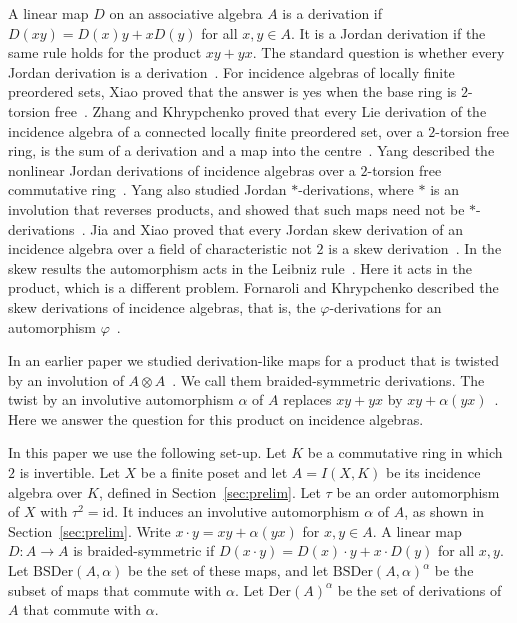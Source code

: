 \documentclass[]{interact}
\theoremstyle{plain}
\theoremstyle{definition}
\theoremstyle{remark}
\newcommand{\Der}{\mathrm{Der}}
\newcommand{\BSDer}{\mathrm{BSDer}}
\begin{document}
A linear map $D$ on an associative algebra $A$ is a derivation if $D(xy) = D(x)y + xD(y)$ for all $x, y \in A$.
It is a Jordan derivation if the same rule holds for the product $xy + yx$. %
The standard question is whether every Jordan derivation is a derivation~\cite{Xiao2015}.
For incidence algebras of locally finite preordered sets, Xiao proved that the answer is yes when the base ring is $2$-torsion free~\cite[Theorem 3.3]{Xiao2015}.
Zhang and Khrypchenko proved that every Lie derivation of the incidence algebra of a connected locally finite preordered set, over a $2$-torsion free ring, is the sum of a derivation and a map into the centre~\cite[Theorem 3.10]{ZhangKhrypchenko2017}.
Yang described the nonlinear Jordan derivations of incidence algebras over a $2$-torsion free commutative ring~\cite[Theorem 3.1]{Yang2021}.
Yang also studied Jordan $*$-derivations, where $*$ is an involution that reverses products, and showed that such maps need not be $*$-derivations~\cite[Example 3.1]{Yang2025}.
Jia and Xiao proved that every Jordan skew derivation of an incidence algebra over a field of characteristic not $2$ is a skew derivation~\cite[Theorem 3.8]{JiaXiao2025}.
In the skew results the automorphism acts in the Leibniz rule~\cite{JiaXiao2025, FornaroliKhrypchenko2023}.
Here it acts in the product, which is a different problem.
Fornaroli and Khrypchenko described the skew derivations of incidence algebras, that is, the $\varphi$-derivations for an automorphism $\varphi$~\cite[Theorem 2.8]{FornaroliKhrypchenko2023}.

In an earlier paper we studied derivation-like maps for a product that is twisted by an involution of $A \otimes A$~\cite[Section 3]{Adrabi2026}.
We call them braided-symmetric derivations.
The twist by an involutive automorphism $\alpha$ of $A$ replaces $xy + yx$ by $xy + \alpha(yx)$~\cite{Adrabi2026}.
Here we answer the question for this product on incidence algebras.

In this paper we use the following set-up. %
Let $K$ be a commutative ring in which $2$ is invertible.
Let $X$ be a finite poset and let $A = I(X,K)$ be its incidence algebra over $K$, defined in Section~\ref{sec:prelim}.
Let $\tau$ be an order automorphism of $X$ with $\tau^2 = \mathrm{id}$.
It induces an involutive automorphism $\alpha$ of $A$, as shown in Section~\ref{sec:prelim}.
Write $x \cdot y = xy + \alpha(yx)$ for $x, y \in A$.
A linear map $D \colon A \to A$ is braided-symmetric if $D(x \cdot y) = D(x) \cdot y + x \cdot D(y)$ for all $x, y$.
Let $\BSDer(A,\alpha)$ be the set of these maps, and let $\BSDer(A,\alpha)^\alpha$ be the subset of maps that commute with $\alpha$.
Let $\Der(A)^\alpha$ be the set of derivations of $A$ that commute with $\alpha$.
\end{document}
